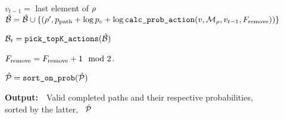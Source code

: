 \begin{figure}
\begin{minipage}{1.\textwidth}
\begin{algorithm}[H]
\begin{algorithmic}[1]
				\STATE $v_{t-1} = $ last element of $\rho$
				\STATE $\hat{{\mathcal{B}}} = \hat{{\mathcal{B}}} \cup \{(\rho' , p_{\textrm{path}} + \log p_c + \log \texttt{calc\_prob\_action}(v, {\mathcal{M}}_\rho, v_{t-1}, F_\textrm{remove}) )\}$
			\ENDFOR
		\ENDFOR
		
		\STATE  ${\mathcal{B}}_{t} = \texttt{pick\_topK\_actions}(\hat{{\mathcal{B}}})$ 
		
		\STATE $F_\textrm{remove} = F_\textrm{remove} + 1 \mod 2$. 
	\ENDFOR
	
  \STATE
  \STATE $\hat{{\mathcal{P}}} = \texttt{sort\_on\_prob}(\hat{{\mathcal{P}}})$
  \end{algorithmic}
  {\bf Output:}~~Valid completed paths and their respective probabilities, sorted by the latter, ~$\hat{{\mathcal{P}}}$
  \label{algo:valid_path}
\end{algorithm}
\end{minipage}
\end{figure}